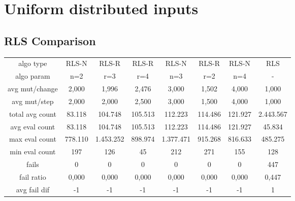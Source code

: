 \section{Uniform distributed inputs}
\subsection{RLS Comparison}
\begin{tabular}[h]{cccccccc}
algo type&            RLS-N&     RLS-R&     RLS-R&     RLS-N&     RLS-R&     RLS-N&       RLS\\
algo param&             n=2&       r=3&       r=4&       n=3&       r=2&       n=4&         -\\
avg mut/change&       2,000&     1,996&     2,476&     3,000&     1,502&     4,000&     1,000\\
avg mut/step&         2,000&     2,000&     2,500&     3,000&     1,500&     4,000&     1,000\\
\hline
total avg count&     83.118&   104.748&   105.513&   112.223&   114.486&   121.927& 2.443.567\\
avg eval count&      83.118&   104.748&   105.513&   112.223&   114.486&   121.927&    45.834\\
max eval count&     778.110& 1.453.252&   898.974& 1.377.471&   915.268&   816.633&   485.275\\
min eval count&         197&       126&        45&       212&       271&       155&       128\\
\hline
fails&                    0&         0&         0&         0&         0&         0&       447\\
fail ratio&           0,000&     0,000&     0,000&     0,000&     0,000&     0,000&     0,447\\
avg fail dif&            -1&        -1&        -1&        -1&        -1&        -1&         1\\
\end{tabular}
